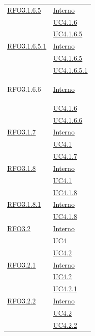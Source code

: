 \begin{longtable}{|>{\centering}m{5cm}|m{5cm}<{\centering}|}
\hyperlink{RFO3.1.6.5}{RFO3.1.6.5} & \hyperlink{Interno}{Interno}\\
& \hyperref[UC4.1.6]{UC4.1.6}\\
& \hyperref[UC4.1.6.5]{UC4.1.6.5}\\ \hline

\hyperlink{RFO3.1.6.5.1}{RFO3.1.6.5.1} & \hyperlink{Interno}{Interno}\\
& \hyperref[UC4.1.6.5]{UC4.1.6.5}\\
& \hyperref[UC4.1.6.5.1]{UC4.1.6.5.1}\\ \hline

\hypertarget{RFO3.1.6.6}{RFO3.1.6.6} & \hyperlink{Interno}{Interno}\\
& \hyperref[UC4.1.6]{UC4.1.6}\\
& \hyperref[UC4.1.6.6]{UC4.1.6.6}\\ \hline

\hyperlink{RFO3.1.7}{RFO3.1.7} & \hyperlink{Interno}{Interno}\\
& \hyperref[UC4.1]{UC4.1}\\
& \hyperref[UC4.1.7]{UC4.1.7}\\ \hline

\hyperlink{RFO3.1.8}{RFO3.1.8} & \hyperlink{Interno}{Interno}\\
& \hyperref[UC4.1]{UC4.1}\\
& \hyperref[UC4.1.8]{UC4.1.8}\\ \hline

\hyperlink{RFO3.1.8.1}{RFO3.1.8.1} & \hyperlink{Interno}{Interno}\\
& \hyperref[UC4.1.8]{UC4.1.8}\\ \hline

\hyperlink{RFO3.2}{RFO3.2} & \hyperlink{Interno}{Interno}\\
& \hyperref[UC4]{UC4}\\
& \hyperref[UC4.2]{UC4.2}\\ \hline

\hyperlink{RFO3.2.1}{RFO3.2.1} & \hyperlink{Interno}{Interno}\\
& \hyperref[UC4.2]{UC4.2}\\
& \hyperref[UC4.2.1]{UC4.2.1}\\ \hline

\hyperlink{RFO3.2.2}{RFO3.2.2} & \hyperlink{Interno}{Interno}\\
& \hyperref[UC4.2]{UC4.2}\\
& \hyperref[UC4.2.2]{UC4.2.2}\\ \hline


\end{longtable}
